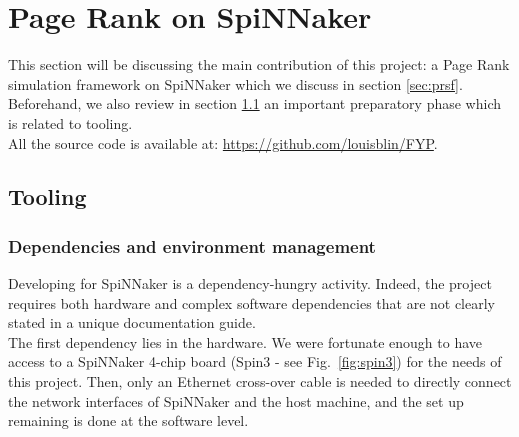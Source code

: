 \section{Page Rank on SpiNNaker} \label{sec:impl}

This section will be discussing the main contribution of this project: a Page Rank simulation framework on SpiNNaker which we discuss in section \ref{sec:prsf}. Beforehand, we also review in section \ref{sec:tool} an important preparatory phase which is related to tooling. \\

All the source code is available at: \url{https://github.com/louisblin/FYP}.

\subsection{Tooling} \label{sec:tool}

\subsubsection{Dependencies and environment management}

Developing for SpiNNaker is a dependency-hungry activity. Indeed, the project requires both hardware and complex software dependencies that are not clearly stated in a unique documentation guide. \\

The first dependency lies in the hardware. We were fortunate enough to have access to a SpiNNaker 4-chip board (Spin3 - see Fig.~\ref{fig:spin3}) for the needs of this project. Then, only an Ethernet cross-over cable is needed to directly connect the network interfaces of SpiNNaker and the host machine, and the set up remaining is done at the software level. \\

